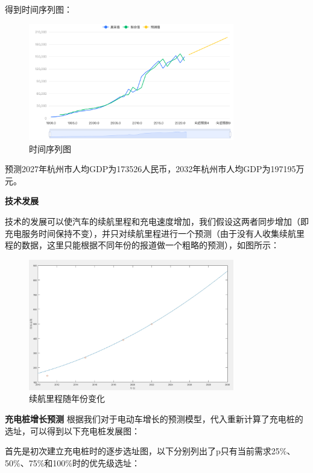 \documentclass[12pt, a4paper, oneside]{ctexart}
\begin{document}
得到时间序列图：

\begin{figure}[H]
  \centering
  \includegraphics[width=0.8\textwidth]{pic/时间序列图.png}
  \caption{时间序列图}
  \label{fig:时间序列图}
\end{figure}



预测2027年杭州市人均GDP为173526人民币，2032年杭州市人均GDP为197195万元。

\textbf{技术发展}

技术的发展可以使汽车的续航里程和充电速度增加，我们假设这两者同步增加（即充电服务时间保持不变），并只对续航里程进行一个预测（由于没有人收集续航里程的数据，这里只能根据不同年份的报道做一个粗略的预测），如图所示：
\begin{figure}[H]
  \centering
  \includegraphics[width=0.8\textwidth]{pic/续航里程.jpg}
  \caption{续航里程随年份变化}
  \label{fig:续航里程}
\end{figure}


\textbf{充电桩增长预测}
根据我们对于电动车增长的预测模型，代入重新计算了充电桩的选址，可以得到以下充电桩发展图：

首先是初次建立充电桩时的逐步选址图，以下分别列出了p只有当前需求25\%、50\%、75\%和100\%时的优先级选址：
\end{document}
